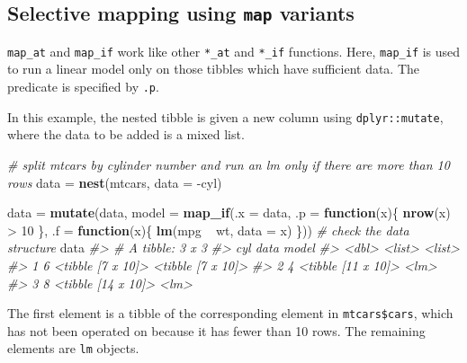 \documentclass[]{book}
\newenvironment{Shaded}{}{}
\newcommand{\CommentTok}[1]{\textcolor[rgb]{0.38,0.63,0.69}{\textit{#1}}}
\newcommand{\ControlFlowTok}[1]{\textcolor[rgb]{0.00,0.44,0.13}{\textbf{#1}}}
\newcommand{\DataTypeTok}[1]{\textcolor[rgb]{0.56,0.13,0.00}{#1}}
\newcommand{\DecValTok}[1]{\textcolor[rgb]{0.25,0.63,0.44}{#1}}
\newcommand{\KeywordTok}[1]{\textcolor[rgb]{0.00,0.44,0.13}{\textbf{#1}}}
\newcommand{\NormalTok}[1]{#1}
\newcommand{\OperatorTok}[1]{\textcolor[rgb]{0.40,0.40,0.40}{#1}}
\newcommand{\StringTok}[1]{\textcolor[rgb]{0.25,0.44,0.63}{#1}}
\begin{document}
\hypertarget{selective-mapping-using-map-variants}{%
\subsection{\texorpdfstring{Selective mapping using \texttt{map} variants}{Selective mapping using map variants}}\label{selective-mapping-using-map-variants}}

\texttt{map\_at} and \texttt{map\_if} work like other \texttt{*\_at} and \texttt{*\_if} functions. Here, \texttt{map\_if} is used to run a linear model only on those tibbles which have sufficient data. The predicate is specified by \texttt{.p}.

In this example, the nested tibble is given a new column using \texttt{dplyr::mutate}, where the data to be added is a mixed list.

\begin{Shaded}
\begin{Highlighting}[]
\CommentTok{# split mtcars by cylinder number and run an lm only if there are more than 10 rows}
\NormalTok{data =}\StringTok{ }\KeywordTok{nest}\NormalTok{(mtcars, }\DataTypeTok{data =} \OperatorTok{-}\NormalTok{cyl)}

\NormalTok{data =}\StringTok{ }\KeywordTok{mutate}\NormalTok{(data,}
               \DataTypeTok{model =} \KeywordTok{map_if}\NormalTok{(}\DataTypeTok{.x =}\NormalTok{ data,}
                              \DataTypeTok{.p =} \ControlFlowTok{function}\NormalTok{(x)\{}
                                \KeywordTok{nrow}\NormalTok{(x) }\OperatorTok{>}\StringTok{ }\DecValTok{10}
\NormalTok{                              \},}
                              \DataTypeTok{.f =} \ControlFlowTok{function}\NormalTok{(x)\{}
                                \KeywordTok{lm}\NormalTok{(mpg }\OperatorTok{~}\StringTok{ }\NormalTok{wt, }\DataTypeTok{data =}\NormalTok{ x)}
\NormalTok{                              \}))}
\CommentTok{# check the data structure}
\NormalTok{data}
\CommentTok{#> # A tibble: 3 x 3}
\CommentTok{#>     cyl data               model            }
\CommentTok{#>   <dbl> <list>             <list>           }
\CommentTok{#> 1     6 <tibble [7 x 10]>  <tibble [7 x 10]>}
\CommentTok{#> 2     4 <tibble [11 x 10]> <lm>             }
\CommentTok{#> 3     8 <tibble [14 x 10]> <lm>}
\end{Highlighting}
\end{Shaded}

The first element is a tibble of the corresponding element in \texttt{mtcars\$cars}, which has not been operated on because it has fewer than 10 rows. The remaining elements are \texttt{lm} objects.
\end{document}
